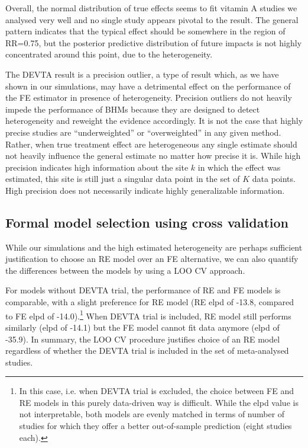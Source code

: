\documentclass[12pt]{article}
\begin{document}
Overall, the normal distribution of true effects seems to fit vitamin A studies we analysed very well and no single study appears pivotal to the result. The general pattern indicates that the typical effect should be somewhere in the region of RR=0.75, but the posterior predictive distribution of future impacts is not highly concentrated around this point, due to the heterogeneity.

The DEVTA result is a precision outlier, a type of result which, as we have shown in our simulations, may have a detrimental effect on the performance of the FE estimator in presence of heterogeneity. Precision outliers do not heavily impede the performance of BHMs because they are designed to detect heterogeneity and reweight the evidence accordingly. It is not the case that highly precise studies are ``underweighted'' or ``overweighted'' in any given method. Rather, when true treatment effect are heterogeneous any single estimate should not heavily influence the general estimate no matter how precise it is. While high precision indicates high information about the site $k$ in which the effect was estimated, this site is still just a singular data point in the set of $K$ data points. High precision does not necessarily indicate highly generalizable information. 


\subsection{Formal model selection using cross validation}

While our simulations and the high estimated heterogeneity are perhaps sufficient justification to choose an RE model over an FE alternative, we can also quantify the differences between the models by using a LOO CV approach.

For models without DEVTA trial, the performance of RE and FE models is comparable, with a slight preference for RE model (RE elpd of -13.8, compared to FE elpd of -14.0).\footnote{In this case, i.e. when DEVTA trial is excluded, the choice between FE and RE models in this purely data-driven way is difficult. While the elpd value is not interpretable, both models are evenly matched in terms of number of studies for which they offer a better out-of-sample prediction (eight studies each).} When DEVTA trial is included, RE model still performs similarly (elpd of -14.1) but the FE model cannot fit data anymore (elpd of -35.9). In summary, the LOO CV procedure justifies choice of an RE model regardless of whether the DEVTA trial is included in the set of meta-analysed studies.
\end{document}

